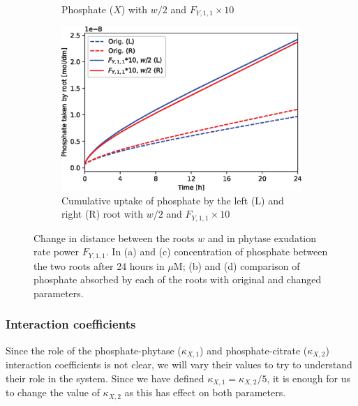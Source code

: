 \documentclass[11pt]{article}
\numberwithin{equation}{section}
\begin{document}
\begin{figure}[!htb]
\begin{subfigure}[t]{0.35\textwidth}
    \caption{Phosphate ($X$) with $w/2$ and $F_{Y,1,1} \times 10$}
    \label{fig:numexp_FY11w1}
\end{subfigure}
\hspace{1cm}
\begin{subfigure}[t]{0.4\textwidth}
    \includegraphics[width=\textwidth]{Figures/FY11times10wdivby2.eps}
    \caption{Cumulative uptake of phosphate by the left (L) and right (R) root with $w/2$ and $F_{Y,1,1} \times 10$}
    \label{fig:numexp_FY11w2}
\end{subfigure}

\caption{Change in distance between the roots $w$ and in phytase exudation rate power $F_{Y,1,1}$. In (a) and (c) concentration of phosphate between the two roots after 24 hours in $\mu$M; (b) and (d) comparison of phosphate absorbed by each of the roots with original and changed parameters.}
\label{fig:numexp_F11w}
\end{figure}

\subsubsection{Interaction coefficients}

Since the role of the phosphate-phytase ($\kappa_{X,1}$) and phosphate-citrate ($\kappa_{X,2}$) interaction coefficients is not clear, we will vary their values to try to understand their role in the system. Since we have defined $\kappa_{X,1}=\kappa_{X,2} / 5$, it is enough for us to change the value of $\kappa_{X,2}$ as this has effect on both parameters.
\end{document}
